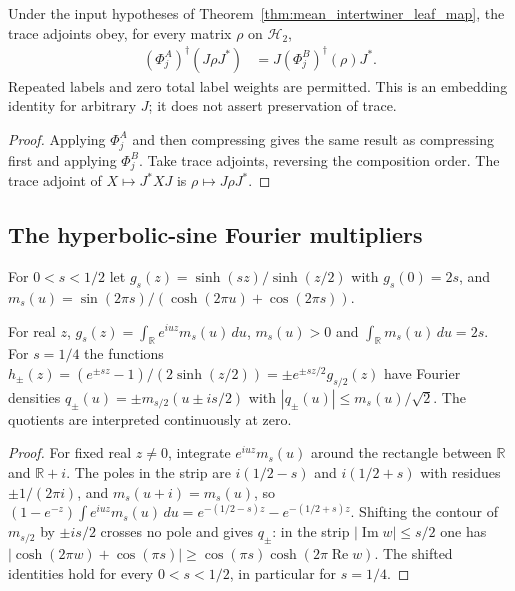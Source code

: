 \begin{theorem}
\label{thm:mean_intertwiner_leaf_adjoint}
\leanok
{}
Under the input hypotheses of Theorem~\ref{thm:mean_intertwiner_leaf_map},
the trace adjoints obey, for every matrix $\rho$ on $\mathcal H_2$,
\begin{align}
 (\Phi_j^A)^\dagger(J\rho J^*)
   &=J(\Phi_j^B)^\dagger(\rho)J^*.
 \label{eq:mean_leaf_adjoint_embed}
\end{align}
Repeated labels and zero total label weights are permitted. This is an
embedding identity for arbitrary $J$; it does not assert preservation of trace.
\end{theorem}
\begin{proof}\leanok
{}
Applying $\Phi_j^A$ and then compressing gives the same result as
compressing first and applying $\Phi_j^B$. Take trace adjoints, reversing
the composition order. The trace adjoint of
$X\mapsto J^*XJ$ is $\rho\mapsto J\rho J^*$.
\end{proof}

\subsection{The hyperbolic-sine Fourier multipliers}

For $0<s<1/2$ let $g_s(z)=\sinh(sz)/\sinh(z/2)$ with $g_s(0)=2s$, and
$m_s(u)=\sin(2\pi s)/(\cosh(2\pi u)+\cos(2\pi s))$.

\begin{lemma}\label{lem:sinh_ratio_fourier}
    \leanok
    For real $z$,
    $g_s(z)=\int_{\mathbb R}e^{iuz}m_s(u)\,du$, $m_s(u)>0$ and
    $\int_{\mathbb R}m_s(u)\,du=2s$. For $s=1/4$ the functions
    $h_\pm(z)=(e^{\pm sz}-1)/(2\sinh(z/2))=\pm e^{\pm sz/2}g_{s/2}(z)$ have Fourier
    densities $q_\pm(u)=\pm m_{s/2}(u\pm is/2)$ with
    $|q_\pm(u)|\le m_s(u)/\sqrt2$. The quotients are interpreted continuously at
    zero.
\end{lemma}

\begin{proof}\leanok
    For fixed real $z\ne0$, integrate $e^{iuz}m_s(u)$ around the rectangle
    between $\mathbb R$ and $\mathbb R+i$. The poles in the strip are
    $i(1/2-s)$ and $i(1/2+s)$ with residues $\pm1/(2\pi i)$, and
    $m_s(u+i)=m_s(u)$, so
    $(1-e^{-z})\int e^{iuz}m_s(u)\,du=e^{-(1/2-s)z}-e^{-(1/2+s)z}$. Shifting the
    contour of $m_{s/2}$ by $\pm is/2$ crosses no pole and gives $q_\pm$: in
    the strip $|\operatorname{Im}w|\le s/2$ one has
    $|\cosh(2\pi w)+\cos(\pi s)|\ge\cos(\pi s)\cosh(2\pi\operatorname{Re}w)$.
    The shifted identities hold for every $0<s<1/2$, in particular for $s=1/4$.
\end{proof}


